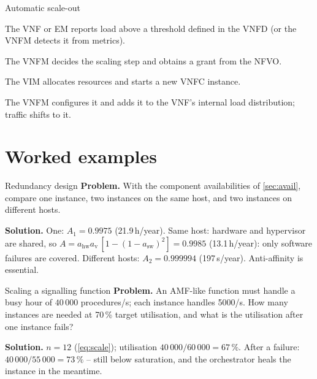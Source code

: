 \documentclass[11pt,a4paper]{article}
\begin{document}
\begin{procedurebox}{Automatic scale-out}\label{proc:scale}
\begin{steps}
  \item The VNF or EM reports load above a threshold defined in the VNFD (or the VNFM detects it from metrics).
  \item The VNFM decides the scaling step and obtains a grant from the NFVO.
  \item The VIM allocates resources and starts a new VNFC instance.
  \item The VNFM configures it and adds it to the VNF's internal load distribution; traffic shifts to it.
\end{steps}
\end{procedurebox}

\begin{acnfigure}
  \caption{Simplified VNF scale-out (\cref{proc:scale}).}
  \label{fig:scale}
\end{acnfigure}

\section{Worked examples}

\begin{examplebox}{Redundancy design}\label{ex:avail}
\textbf{Problem.} With the component availabilities of \cref{sec:avail}, compare one instance, two instances on the same
host, and two instances on different hosts.

\textbf{Solution.} One: $A_1 = 0.9975$ (21.9\,h/year). Same host: hardware and hypervisor are shared, so
$A = a_{\mathrm{hw}}a_{\mathrm{v}}\,[1-(1-a_{\mathrm{sw}})^2] = 0.9985$ (13.1\,h/year): only software failures are covered.
Different hosts: $A_2 = 0.999994$ (197\,s/year). Anti-affinity is essential.
\end{examplebox}

\begin{examplebox}{Scaling a signalling function}\label{ex:scale}
\textbf{Problem.} An AMF-like function must handle a busy hour of $40\,000$ procedures/s; each instance handles 5000/s.
How many instances are needed at 70\,\% target utilisation, and what is the utilisation after one instance fails?

\textbf{Solution.} $n = 12$ (\cref{eq:scale}); utilisation $40\,000/60\,000 = 67\,\%$. After a failure: $40\,000/55\,000 = 73\,\%$ --
still below saturation, and the orchestrator heals the instance in the meantime.
\end{examplebox}
\end{document}
